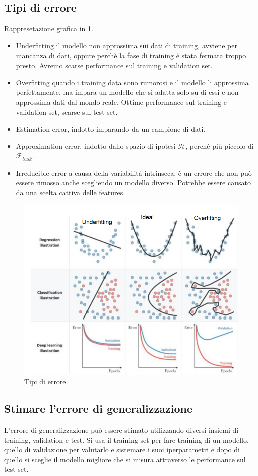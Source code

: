 \subsection{Tipi di errore}
Rappresetazione grafica in \ref{fig:chapter02-11}.
\begin{multicols}{2}
	\begin{itemize}
		\item Underfitting il modello non approssima sui dati di training, avviene per mancanza di dati, oppure perch\`e la fase di training \`e stata fermata troppo presto. Avremo scarse performance sul training e validation set.
		\item Overfitting quando i training data sono rumorosi e il modello li approssima perfettamente, ma impara un modello che si adatta solo su di essi e non approssima dati dal mondo reale. Ottime performance sul training e validation set, scarse sul test set.
		\item Estimation error, indotto imparando da un campione di dati.
		\item Approximation error, indotto dallo spazio di ipotesi $\mathcal{H}$, perché più piccolo di $\mathcal{F}_{task}$.
		\item Irreducible error a causa della variabilit\`a intrinseca. \`e un errore che non può essere rimosso anche scegliendo un modello diverso. Potrebbe essere causato da una scelta cattiva delle features.
	\end{itemize}
\end{multicols}
\begin{figure}
	\centering
	\includegraphics[width=0.6\linewidth]{imgs/chapter2/img11}
	\caption{Tipi di errore}
	\label{fig:chapter02-11}
\end{figure}
\subsection{Stimare l'errore di generalizzazione}
L'errore di generalizzazione pu\`o essere stimato utilizzando diversi insiemi di training, validation e test.
Si usa il training set per fare training di un modello, quello di validazione per valutarlo e sistemare i suoi iperparametri e dopo di quello si sceglie il modello migliore che si misura attraverso le performance sul test set.

